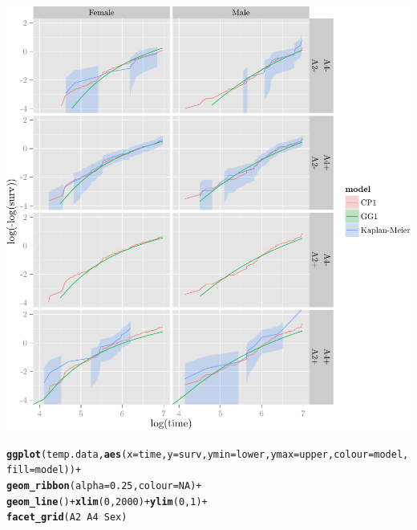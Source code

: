 \documentclass{article}\usepackage[]{graphicx}\usepackage[]{color}
\makeatletter
\def\maxwidth{ %
  \ifdim\Gin@nat@width>\linewidth
    \linewidth
  \else
    \Gin@nat@width
  \fi
}
\newcommand{\hlnum}[1]{\textcolor[rgb]{0.686,0.059,0.569}{#1}}%
\newcommand{\hlopt}[1]{\textcolor[rgb]{0,0,0}{#1}}%
\newcommand{\hlstd}[1]{\textcolor[rgb]{0.345,0.345,0.345}{#1}}%
\newcommand{\hlkwc}[1]{\textcolor[rgb]{0.333,0.667,0.333}{#1}}%
\newcommand{\hlkwd}[1]{\textcolor[rgb]{0.737,0.353,0.396}{\textbf{#1}}}%
\newenvironment{kframe}{%
 \def\at@end@of@kframe{}%
 \ifinner\ifhmode%
  \def\at@end@of@kframe{\end{minipage}}%
  \begin{minipage}{\columnwidth}%
 \fi\fi%
 \def\FrameCommand##1{\hskip\@totalleftmargin \hskip-\fboxsep
 \colorbox{shadecolor}{##1}\hskip-\fboxsep
     \hskip-\linewidth \hskip-\@totalleftmargin \hskip\columnwidth}%
 \MakeFramed {\advance\hsize-\width
   \@totalleftmargin\z@ \linewidth\hsize
   \@setminipage}}%
 {\par\unskip\endMakeFramed%
 \at@end@of@kframe}
\newenvironment{knitrout}{}{} %
\makeatother
\begin{document}
\begin{knitrout}
\begin{kframe}
{\ttfamily\noindent\color{warningcolor}{\#\# Warning: Removed 45 rows containing missing values (geom\_path).}}

{\ttfamily\noindent\color{warningcolor}{\#\# Warning: Removed 38 rows containing missing values (geom\_path).}}\end{kframe}

{\centering \includegraphics[width=\maxwidth]{figure/05-final-fit-assessment-4-1} 

}


\begin{kframe}\begin{alltt}
\hlkwd{ggplot}\hlstd{(temp.data,} \hlkwd{aes}\hlstd{(}\hlkwc{x} \hlstd{= time,} \hlkwc{y} \hlstd{= surv,} \hlkwc{ymin} \hlstd{= lower,} \hlkwc{ymax} \hlstd{= upper,} \hlkwc{colour} \hlstd{= model,} \hlkwc{fill} \hlstd{= model))} \hlopt{+}
        \hlkwd{geom_ribbon}\hlstd{(}\hlkwc{alpha} \hlstd{=} \hlnum{0.25}\hlstd{,} \hlkwc{colour} \hlstd{=} \hlnum{NA}\hlstd{)} \hlopt{+}
        \hlkwd{geom_line}\hlstd{()} \hlopt{+} \hlkwd{xlim}\hlstd{(}\hlnum{0}\hlstd{,} \hlnum{2000}\hlstd{)} \hlopt{+} \hlkwd{ylim}\hlstd{(}\hlnum{0}\hlstd{,} \hlnum{1}\hlstd{)} \hlopt{+}
        \hlkwd{facet_grid}\hlstd{(A2} \hlopt{~} \hlstd{A4} \hlopt{~} \hlstd{Sex)}
\end{alltt}



\end{kframe}
\end{knitrout}
\end{document}
